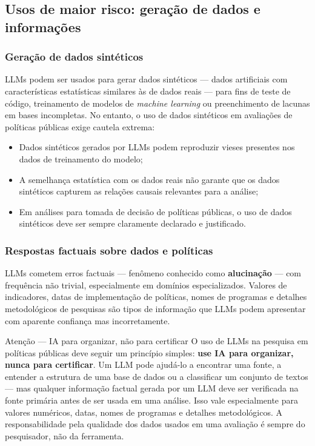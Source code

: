 \subsection{Usos de maior risco: geração de dados e informações}

\subsubsection{Geração de dados sintéticos}

LLMs podem ser usados para gerar dados sintéticos --- dados artificiais com características estatísticas similares às de dados reais --- para fins de teste de código, treinamento de modelos de \textit{machine learning} ou preenchimento de lacunas em bases incompletas. No entanto, o uso de dados sintéticos em avaliações de políticas públicas exige cautela extrema:

\begin{itemize}
  \item Dados sintéticos gerados por LLMs podem reproduzir vieses presentes nos dados de treinamento do modelo;
  \item A semelhança estatística com os dados reais não garante que os dados sintéticos capturem as relações causais relevantes para a análise;
  \item Em análises para tomada de decisão de políticas públicas, o uso de dados sintéticos deve ser sempre claramente declarado e justificado.
\end{itemize}

\subsubsection{Respostas factuais sobre dados e políticas}

LLMs cometem erros factuais --- fenômeno conhecido como \textbf{alucinação} --- com frequência não trivial, especialmente em domínios especializados. Valores de indicadores, datas de implementação de políticas, nomes de programas e detalhes metodológicos de pesquisas são tipos de informação que LLMs podem apresentar com aparente confiança mas incorretamente.

\begin{boxatencao}{Atenção --- IA para organizar, não para certificar}
O uso de LLMs na pesquisa em políticas públicas deve seguir um princípio simples: \textbf{use IA para organizar, nunca para certificar}. Um LLM pode ajudá-lo a encontrar uma fonte, a entender a estrutura de uma base de dados ou a classificar um conjunto de textos --- mas qualquer informação factual gerada por um LLM deve ser verificada na fonte primária antes de ser usada em uma análise. Isso vale especialmente para valores numéricos, datas, nomes de programas e detalhes metodológicos. A responsabilidade pela qualidade dos dados usados em uma avaliação é sempre do pesquisador, não da ferramenta.
\end{boxatencao}

